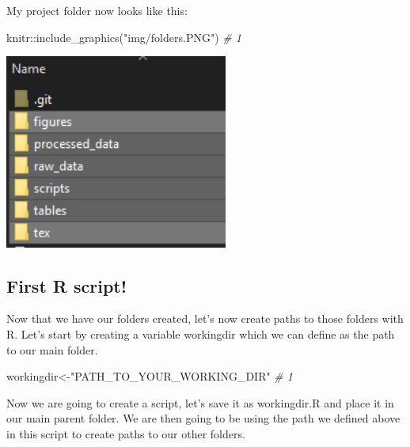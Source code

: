 \documentclass[
]{book}
\newenvironment{Shaded}{\begin{snugshade}}{\end{snugshade}}
\newcommand{\CommentTok}[1]{\textcolor[rgb]{0.56,0.35,0.01}{\textit{#1}}}
\newcommand{\FunctionTok}[1]{\textcolor[rgb]{0.00,0.00,0.00}{#1}}
\newcommand{\NormalTok}[1]{#1}
\newcommand{\OtherTok}[1]{\textcolor[rgb]{0.56,0.35,0.01}{#1}}
\newcommand{\SpecialCharTok}[1]{\textcolor[rgb]{0.00,0.00,0.00}{#1}}
\newcommand{\StringTok}[1]{\textcolor[rgb]{0.31,0.60,0.02}{#1}}
\begin{document}
My project folder now looks like this:

\begin{Shaded}
\begin{Highlighting}[]
\NormalTok{knitr}\SpecialCharTok{::}\FunctionTok{include\_graphics}\NormalTok{(}\StringTok{"img/folders.PNG"}\NormalTok{)  }\CommentTok{\# 1}
\end{Highlighting}
\end{Shaded}

\includegraphics[width=2.89in]{img/folders}

\hypertarget{first-r-script}{%
\subsection{First R script!}\label{first-r-script}}

Now that we have our folders created, let's now create paths to those folders with R. Let's start by creating a variable workingdir which we can define as the path to our main folder.

\begin{Shaded}
\begin{Highlighting}[]
\NormalTok{workingdir}\OtherTok{\textless{}{-}}\StringTok{"PATH\_TO\_YOUR\_WORKING\_DIR"}  \CommentTok{\# 1}
\end{Highlighting}
\end{Shaded}

Now we are going to create a script, let's save it as workingdir.R and place it in our main parent folder. We are then going to be using the path we defined above in this script to create paths to our other folders.
\end{document}
